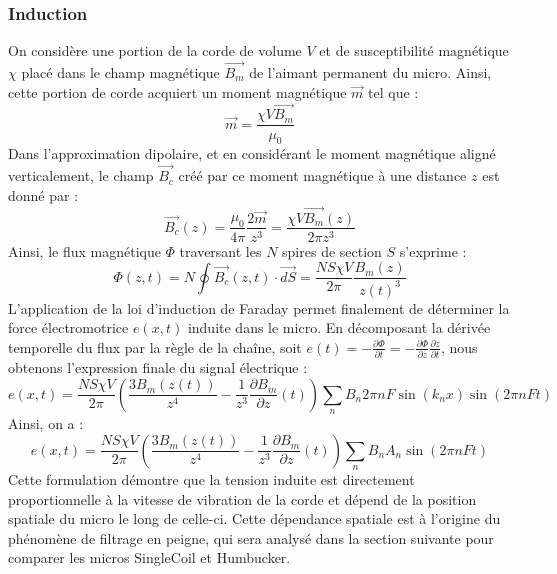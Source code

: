 \documentclass[11pt, a4paper]{article}
\begin{document}
\subsubsection{Induction}
On considère une portion de la corde de volume $V$ et de susceptibilité magnétique $\chi$ placé dans le champ magnétique $\vec{B_m}$ de l'aimant permanent du micro. Ainsi, cette portion de corde acquiert un moment magnétique $\vec{m}$ tel que :
\begin{equation}
\vec{m} = \frac{\chi V \vec{B_m}}{\mu_0}
\end{equation}
Dans l'approximation dipolaire, et en considérant le moment magnétique aligné verticalement, le champ $\vec{B_c}$ créé par ce moment magnétique à une distance $z$ est donné par :
\begin{equation}
\vec{B_c}(z) = \frac{\mu_0}{4\pi} \frac{2\vec{m}}{z^3} = \frac{\chi V \vec{B_m}(z)}{2\pi z^3}
\end{equation}
Ainsi, le flux magnétique $\Phi$ traversant les $N$ spires de section $S$ s'exprime :
\begin{equation}
\Phi(z,t) = N \oint \vec{B_c}(z,t) \cdot \vec{dS} = \frac{N S \chi V}{2\pi} \frac{B_m(z)}{z(t)^3}
\end{equation}
L'application de la loi d'induction de Faraday permet finalement de déterminer la force électromotrice $e(x,t)$ induite dans le micro. En décomposant la dérivée temporelle du flux par la règle de la chaîne, soit $e(t) = -\frac{\partial\Phi}{\partial t} = -\frac{\partial\Phi}{\partial z}\frac{\partial z}{\partial t}$, nous obtenons l'expression finale du signal électrique :
\begin{equation}
e(x,t) = \frac{N S \chi V}{2\pi} \left( \frac{3B_m(z(t))}{z^4} - \frac{1}{z^3} \frac{\partial B_m}{\partial z}(t) \right) \sum_{n} B_n 2\pi n F \sin(k_n x) \sin(2\pi n F t)
\end{equation}
Ainsi, on a :
\begin{equation}
e(x,t) = \frac{N S \chi V}{2\pi} \left( \frac{3B_m(z(t))}{z^4} - \frac{1}{z^3} \frac{\partial B_m}{\partial z}(t) \right) \sum_{n} B_n A_n \sin(2\pi n F t)
\end{equation}
Cette formulation démontre que la tension induite est directement proportionnelle à la vitesse de vibration de la corde et dépend de la position spatiale du micro le long de celle-ci. Cette dépendance spatiale est à l'origine du phénomène de filtrage en peigne, qui sera analysé dans la section suivante pour comparer les micros SingleCoil et Humbucker.
\end{document}
